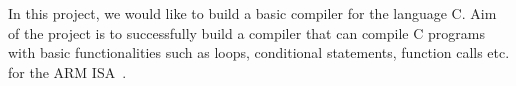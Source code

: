 In this project, we would like to build a basic compiler for the 
language C. Aim of the project is to successfully build a compiler 
that can compile C programs with basic functionalities such as loops, 
conditional statements, function calls etc. for the ARM ISA~\cite{ARM}.